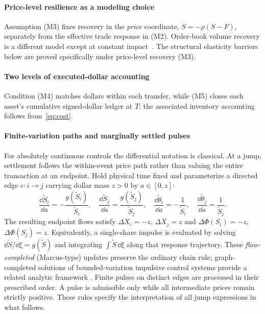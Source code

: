 \documentclass[review,hidelinks,onefignum,onetabnum]{siamonline250211}
\begin{document}
\paragraph{Price-level resilience as a modeling choice}
Assumption (M3) fixes recovery in the \emph{price} coordinate,
$\dot S=-\rho(S-F)$, separately from the effective trade response in (M2).
Order-book volume recovery is a different model except at constant impact~\citep{RochSoner2013}. The structural elasticity barriers below are proved specifically under price-level recovery (M3).

\paragraph{Two levels of executed-dollar accounting}
Condition (M4) matches dollars within each transfer, while
(M5) closes each asset's cumulative signed-dollar ledger
at $T$; the associated inventory accounting follows from~\eqref{eq:cost}.

\paragraph{Finite-variation paths and marginally settled pulses}
For absolutely continuous controls the differential notation is classical. At a jump, settlement follows the within-event price path rather than valuing the entire transaction at an endpoint. Hold physical time fixed and parameterize a directed edge $e:i\to j$ carrying dollar mass $z>0$ by $a\in[0,z]$:
\begin{equation}\label{eq:pulse-flow}
\frac{\dd \widetilde S_i}{\dd a}=-\frac{g(\widetilde S_i)}{\widetilde S_i},\quad
\frac{\dd \widetilde S_j}{\dd a}=\frac{g(\widetilde S_j)}{\widetilde S_j},\quad
\frac{\dd\widetilde\theta_i}{\dd a}=-\frac{1}{\widetilde S_i},\quad
\frac{\dd\widetilde\theta_j}{\dd a}=\frac{1}{\widetilde S_j}.
\end{equation}
The resulting endpoint flows satisfy $\Delta X_i=-z$, $\Delta X_j=z$ and $\Delta\Phi(S_i)=-z$, $\Delta\Phi(S_j)=z$. Equivalently, a single-share impulse is evaluated by solving $\dd\widetilde S/\dd\xi=g(\widetilde S)$ and integrating $\int\widetilde S\,\dd\xi$ along that response trajectory. These \emph{flow-completed} (Marcus-type) updates preserve the ordinary chain rule; graph-completed solutions of bounded-variation impulsive control systems provide a related analytic framework \citep{BressanRampazzo1988}. Finite pulses on distinct edges are processed in their prescribed order. A pulse is admissible only while all intermediate prices remain strictly positive. These rules specify the interpretation of all jump expressions in what follows.
\end{document}
